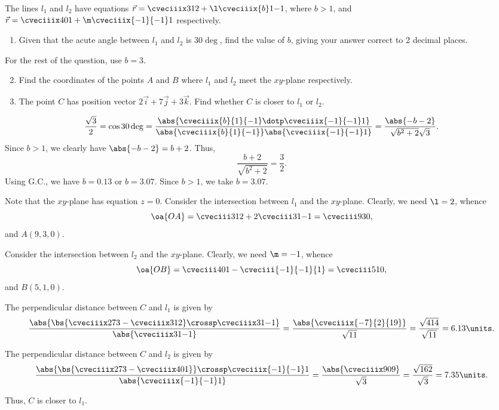 \begin{problem}
    The lines $l_1$ and $l_2$ have equations $\vec r = \cveciiix312 + \l \cveciiix{b}1{-1}$, where $b > 1$, and $\vec r = \cveciiix401 + \m\cveciiix{-1}{-1}1$ respectively.

    \begin{enumerate}
        \item Given that the acute angle between $l_1$ and $l_2$ is $30\deg$, find the value of $b$, giving your answer correct to 2 decimal places.
    \end{enumerate}

    For the rest of the question, use $b = 3$.

    \begin{enumerate}
        \setcounter{enumi}{1}
        \item Find the coordinates of the points $A$ and $B$ where $l_1$ and $l_2$ meet the $xy$-plane respectively.
        \item The point $C$ has position vector $2\vec i + 7\vec j + 3\vec k$. Find whether $C$ is closer to $l_1$ or $l_2$.
    \end{enumerate}
\end{problem}
\begin{solution}
    \begin{ppart}
        \[\frac{\sqrt3}{2} = \cos 30\deg = \frac{\abs{\cveciiix{b}{1}{-1} \dotp \cveciiix{-1}{-1}1}}{\abs{\cveciiix{b}{1}{-1}} \abs{\cveciiix{-1}{-1}1}} = \frac{\abs{-b-2}}{\sqrt{b^2 + 2} \sqrt{3}}.\] Since $b > 1$, we clearly have $\abs{-b-2} = b+2$. Thus, \[\frac{b+2}{\sqrt{b^2 + 2}} = \frac32.\] Using G.C., we have $b = 0.13$ or $b = 3.07$. Since $b > 1$, we take $b = 3.07$.
    \end{ppart}
    \begin{ppart}
        Note that the $xy$-plane has equation $z = 0$. Consider the intersection between $l_1$ and the $xy$-plane. Clearly, we need $\l = 2$, whence \[\oa{OA} = \cveciii312 + 2\cveciii31{-1} = \cveciii930,\] and $A(9, 3, 0)$.

        Consider the intersection between $l_2$ and the $xy$-plane. Clearly, we need $\m = -1$, whence \[\oa{OB} = \cveciii401 - \cveciii{-1}{-1}{1} = \cveciii510,\] and $B(5, 1, 0)$.
    \end{ppart}
    \begin{ppart}
        The perpendicular distance between $C$ and $l_1$ is given by \[\frac{\abs{\bs{\cveciiix273 - \cveciiix312} \crossp \cveciiix31{-1}}}{\abs{\cveciiix31{-1}}} = \frac{\abs{\cveciiix{-7}{2}{19}}}{\sqrt{11}} = \frac{\sqrt{414}}{\sqrt{11}} = 6.13 \units.\]

        The perpendicular distance between $C$ and $l_2$ is given by \[\frac{\abs{\bs{\cveciiix273 - \cveciiix401}} \crossp \cveciiix{-1}{-1}1}{\abs{\cveciiix{-1}{-1}1}} = \frac{\abs{\cveciiix909}}{\sqrt3} = \frac{\sqrt{162}}{\sqrt3} = 7.35 \units.\]

        Thus, $C$ is closer to $l_1$.
    \end{ppart}
\end{solution}

